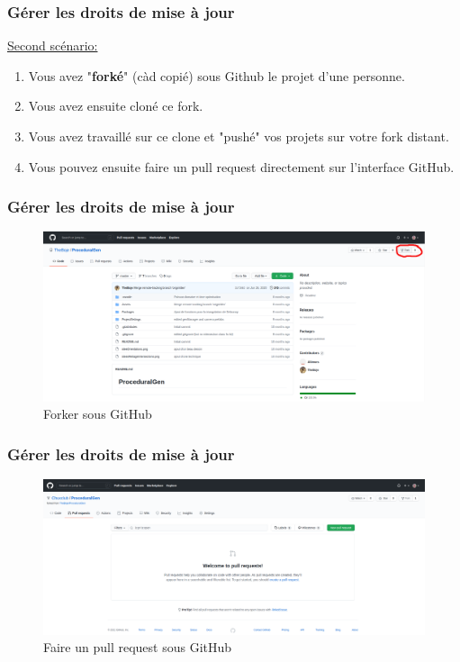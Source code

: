 \documentclass{beamer}
\begin{document}
\begin{frame}
\frametitle{Gérer les droits de mise à jour}

\underline{Second scénario:}\\
\smallskip

\begin{enumerate}
    \item Vous avez "\textbf{forké}" (càd copié) sous Github le projet d'une personne.
    \item Vous avez ensuite cloné ce fork.
    \item Vous avez travaillé sur ce clone et "pushé" vos projets sur votre fork distant.
    \item Vous pouvez ensuite faire un pull request directement sur l'interface GitHub.
\end{enumerate}

\normalsize
\end{frame}

\begin{frame}
\frametitle{Gérer les droits de mise à jour}
\begin{figure}[h!]
    \includegraphics[scale=0.15]{images/droits_push/fork.png}
    \caption{Forker sous GitHub}
\end{figure}
\end{frame}

\begin{frame}
\frametitle{Gérer les droits de mise à jour}
\begin{figure}[h!]
    \includegraphics[scale=0.15]{images/droits_push/pull_request.png}
    \caption{Faire un pull request sous GitHub}
\end{figure}
\end{frame}
\end{document}
